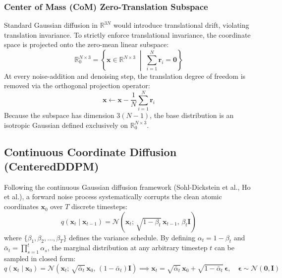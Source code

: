 \documentclass[11pt, a4paper]{article}
\begin{document}
\subsubsection{Center of Mass (CoM) Zero-Translation Subspace}
Standard Gaussian diffusion in $\mathbb{R}^{3N}$ would introduce translational drift, violating translation invariance. To strictly enforce translational invariance, the coordinate space is projected onto the zero-mean linear subspace:
\begin{equation}
\mathbb{R}_0^{N \times 3} = \left\{ \bm{x} \in \mathbb{R}^{N \times 3} \;\middle|\; \sum_{i=1}^N \bm{r}_i = \bm{0} \right\}
\end{equation}
At every noise-addition and denoising step, the translation degree of freedom is removed via the orthogonal projection operator:
\begin{equation}
\bm{x} \leftarrow \bm{x} - \frac{1}{N} \sum_{i=1}^N \bm{r}_i
\end{equation}
Because the subspace has dimension $3(N-1)$, the base distribution is an isotropic Gaussian defined exclusively on $\mathbb{R}_0^{N \times 3}$.

\subsection{Continuous Coordinate Diffusion (CenteredDDPM)}
Following the continuous Gaussian diffusion framework (Sohl-Dickstein et al., Ho et al.), a forward noise process systematically corrupts the clean atomic coordinates $\bm{x}_0$ over $T$ discrete timesteps:
\begin{equation}
q(\bm{x}_t \mid \bm{x}_{t-1}) = \mathcal{N}\left(\bm{x}_t;\, \sqrt{1 - \beta_t}\,\bm{x}_{t-1},\, \beta_t \bm{I}\right)
\end{equation}
where $\{\beta_1, \beta_2, \dots, \beta_T\}$ defines the variance schedule. By defining $\alpha_t = 1 - \beta_t$ and $\bar{\alpha}_t = \prod_{s=1}^t \alpha_s$, the marginal distribution at any arbitrary timestep $t$ can be sampled in closed form:
\begin{equation}
q(\bm{x}_t \mid \bm{x}_0) = \mathcal{N}\left(\bm{x}_t;\, \sqrt{\bar{\alpha}_t}\,\bm{x}_0,\, (1 - \bar{\alpha}_t)\bm{I}\right) \implies \bm{x}_t = \sqrt{\bar{\alpha}_t}\,\bm{x}_0 + \sqrt{1 - \bar{\alpha}_t}\,\bm{\epsilon}, \quad \bm{\epsilon} \sim \mathcal{N}(\bm{0}, \bm{I})
\end{equation}
\end{document}
